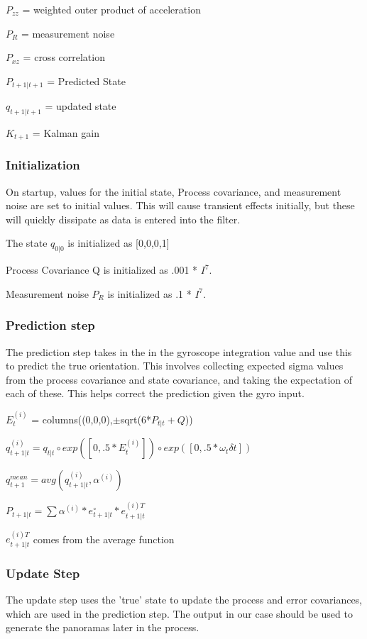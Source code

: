 \documentclass[a4paper]{article}
\begin{document}
$P_{zz}$ = weighted outer product of acceleration

$P_R$ = measurement noise

$P_{xz}$ = cross correlation

$P_{t+1|t+1}$ = Predicted State

$q_{t+1|t+1}$ = updated state

$K_{t+1}$ = Kalman gain

\subsubsection{Initialization}

On startup, values for the initial state, Process covariance, and measurement noise are set to initial values. This will cause transient effects initially, but these will quickly dissipate as data is entered into the filter.

The state $q_{0|0}$ is initialized as [0,0,0,1]

Process Covariance Q is initialized as .001 * $I^7$.

Measurement noise $P_R$ is initialized as .1 * $I^7$.

\subsubsection{Prediction step}

The prediction step takes in the in the gyroscope integration value and use this to predict the true orientation. This involves collecting expected sigma values from the process covariance and state covariance, and taking the expectation of each of these. This helps correct the prediction given the gyro input.

$E_t^{(i)}$ = columns((0,0,0),$\pm$sqrt(6*$P_{t|t} + Q$))

$q_{t+1|t}^{(i)} = q_{t|t} \circ exp([0,.5*E_t^{(i)}]) \circ exp([0,.5 * \omega _t \delta t])$

$q_{t+1}^{mean} = avg(q_{t+1|t}^{(i)},\alpha ^{(i)})$

$P_{t+1|t} = \sum{\alpha ^{(i)} * e_{t+1|t}^\circ * e_{t+1|t}^{(i) T}}$

$e_{t+1|t}^{(i) T}$ comes from the average function

\subsubsection{Update Step}

The update step uses the 'true' state to update the process and error covariances, which are used in the prediction step. The output in our case should be used to generate the panoramas later in the process.
\end{document}
